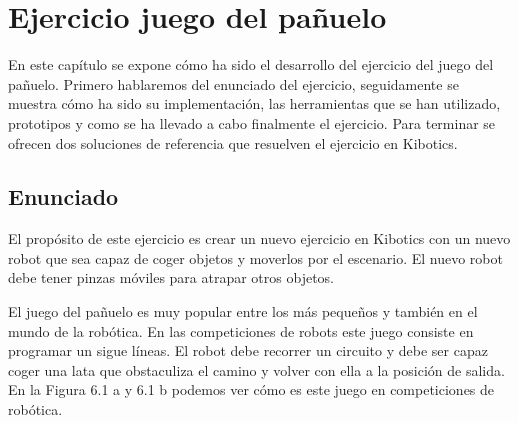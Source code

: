 \chapter{Ejercicio juego del pañuelo} \label{gripper}
En este capítulo se expone cómo ha sido el desarrollo del ejercicio del juego del pañuelo. Primero hablaremos del enunciado del ejercicio, seguidamente se muestra cómo ha sido su implementación, las herramientas que se han utilizado, prototipos y como se ha llevado a cabo finalmente el ejercicio. Para terminar se ofrecen dos soluciones de referencia que resuelven el ejercicio en Kibotics.

\section{Enunciado}
El propósito de este ejercicio es crear un nuevo ejercicio en Kibotics con un nuevo robot que sea capaz de coger objetos y moverlos por el escenario. El nuevo robot debe tener pinzas móviles para atrapar otros objetos. 

El juego del pañuelo es muy popular entre los más pequeños y también en el mundo de la robótica. En las competiciones de robots este juego consiste en programar un sigue líneas. El robot debe recorrer un circuito y debe ser capaz coger una lata que obstaculiza el camino  y volver con ella a la posición de salida. En la Figura 6.1 a y 6.1 b podemos ver cómo es este juego en competiciones de robótica.

